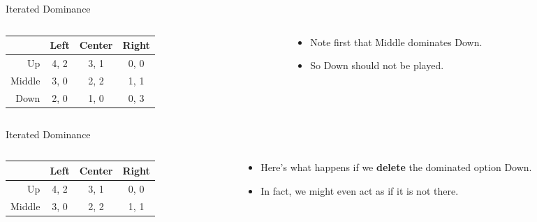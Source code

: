 \documentclass[
  14pt,
  letterpaper,
  ignorenonframetext,
  aspectratio=169,
]{beamer}
\providecommand{\tightlist}{%
  \setlength{\itemsep}{0pt}\setlength{\parskip}{0pt}}\usepackage{longtable,booktabs,array}
\let\olditem\item
\renewcommand{\item}{%
\olditem\vspace{6pt}}
\begin{document}
\begin{frame}{Iterated Dominance}
\protect\hypertarget{iterated-dominance-1}{}
\begin{columns}[T]
\begin{column}{0.5\textwidth}
\begin{table}[!h]
\centering
\begin{tabular}[t]{>{}r|ccc}
\toprule
 & Left & Center & Right\\
\midrule
Up & 4, 2 & 3, 1 & 0, 0\\
Middle & 3, 0 & 2, 2 & 1, 1\\
Down & 2, 0 & 1, 0 & 0, 3\\
\bottomrule
\end{tabular}
\end{table}
\end{column}

\begin{column}{0.5\textwidth}
\begin{itemize}[<+->]
\tightlist
\item
  Note first that Middle dominates Down.
\item
  So Down should not be played.
\end{itemize}
\end{column}
\end{columns}
\end{frame}

\begin{frame}{Iterated Dominance}
\protect\hypertarget{iterated-dominance-2}{}
\begin{columns}[T]
\begin{column}{0.5\textwidth}
\begin{table}[!h]
\centering
\begin{tabular}[t]{>{}r|ccc}
\toprule
 & Left & Center & Right\\
\midrule
Up & 4, 2 & 3, 1 & 0, 0\\
Middle & 3, 0 & 2, 2 & 1, 1\\
\bottomrule
\end{tabular}
\end{table}
\end{column}

\begin{column}{0.5\textwidth}
\begin{itemize}[<+->]
\tightlist
\item
  Here's what happens if we \textbf{delete} the dominated option Down.
\item
  In fact, we might even act as if it is not there.
\end{itemize}
\end{column}
\end{columns}
\end{frame}
\end{document}
